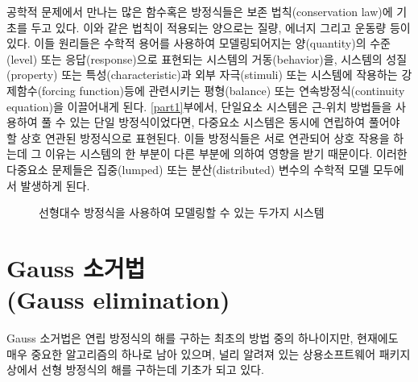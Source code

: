 공학적 문제에서 만나는 많은 함수혹은 방정식들은 보존 법칙(conservation law)에 기초를 두고 있다. 이와 같은 법칙이 적용되는 양으로는 질량, 에너지 그리고 운동량 등이 있다. 이들 원리들은 수학적 용어를 사용하여 모델링되어지는 양(quantity)의 수준(level) 또는 응답(response)으로 표현되는 시스템의 거동(behavior)을, 시스템의 성질(property) 또는 특성(characteristic)과 외부 자극(stimuli) 또는 시스템에 작용하는 강제함수(forcing function)등에 관련시키는 평형(balance) 또는 연속방정식(continuity equation)을 이끌어내게 된다.
\ref{part1}부에서, 단일요소 시스템은 근-위치 방법들을 사용하여 풀 수 있는 단일 방정식이었다면, 다중요소 시스템은 동시에 연립하여 풀어야 할 상호 연관된 방정식으로 표현된다. 이들 방정식들은 서로 연관되어 상호 작용을 하는데 그 이유는 시스템의 한 부분이 다른 부분에 의하여 영향을 받기 때문이다. 이러한 다중요소 문제들은 집중(lumped) 또는 분산(distributed) 변수의 수학적 모델 모두에서 발생하게 된다.
\begin{figure}[!hbpt]
\centering
{}
\caption{선형대수 방정식을 사용하여 모델링할 수 있는 두가지 시스템}
\label{fig:pt3-1}
\end{figure}

\section{Gauss 소거법\\(Gauss elimination)}
Gauss 소거법은 연립 방정식의 해를 구하는 최초의 방법 중의 하나이지만, 현재에도 매우 중요한 알고리즘의 하나로 남아 있으며, 널리 알려져 있는 상용소프트웨어 패키지상에서 선형 방정식의 해를 구하는데 기초가 되고 있다.
